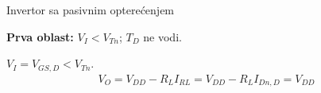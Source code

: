 \begin{frame}[label=09_1-s012]{Invertor sa pasivnim opterećenjem}\setlength{\parskip}{2pt}\setlength{\abovedisplayskip}{4pt}\setlength{\belowdisplayskip}{4pt}\setlength{\abovedisplayshortskip}{3pt}\setlength{\belowdisplayshortskip}{3pt}
\begin{center}\hspace{15mm}\end{center}\textbf{Prva oblast:} $V_I<V_{Tn}$; $T_D$ ne vodi.\par $V_I=V_{GS,D}<V_{Tn}$.
\[
\begin{aligned}
V_O=V_{DD}-R_LI_{RL}=V_{DD}-R_LI_{Dn,D}=V_{DD}
\end{aligned}
\]

\end{frame}
